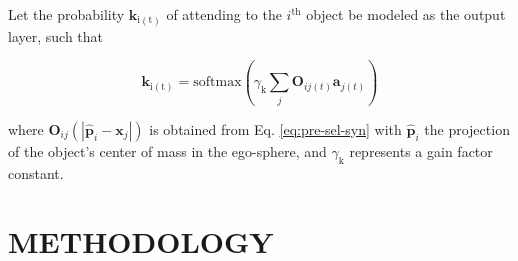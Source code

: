 \documentclass[letterpaper, 10 pt, conference]{ieeeconf}  %
\begin{document}
	Let the probability $\mathbf{k}_\mathrm{i(t)}$ of attending to the $i^\mathrm{th}$ object be modeled as the output layer, such that
	
	\begin{equation}
	\mathbf{k}_\mathrm{i(t)} = \mathrm{softmax}\left(\gamma_{\mathrm{k}}\sum_{j}^{} \mathbf{O}_{ij(t)}\mathbf{a}_{j(t)}\right)
	\label{eq:out}
	\end{equation}
	
	\noindent where $\mathbf{O}_{ij}(|\mathbf{\hat{p}}_i-\mathbf{x}_j|)$ is obtained from Eq. \eqref{eq:pre-sel-syn} with $\mathbf{\hat{p}}_i$ the projection of the object's center of mass in the ego-sphere, and $\gamma_{\mathrm{k}}$ represents a gain factor constant.
	


	

%	
%			
%	
	
	\section{METHODOLOGY}
	\label{sec:methodology}
\end{document}

